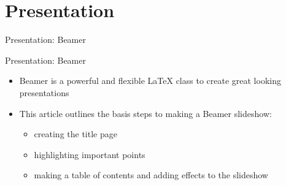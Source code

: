 \documentclass[11pt]{beamer}
\begin{document}
	\section{Presentation}
	\begin{frame}{}
		\begin{center}
			\huge {Presentation: Beamer}
		\end{center}	
	\end{frame}
	\begin{frame}{Presentation: Beamer}
		\begin{itemize}
			\item Beamer is a powerful and flexible LaTeX class to create great looking presentations
			\item This article outlines the basis steps to making a Beamer slideshow:
			\begin{itemize}
				\item creating the title page
				\item highlighting important points
				\item making a table of contents and adding effects to the slideshow
			\end{itemize}
		\end{itemize}
	\end{frame}
\end{document}
